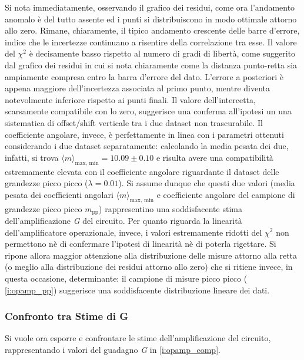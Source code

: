 \documentclass[a4paper,11pt]{article} %
\begin{document}
\noindent Si nota immediatamente, osservando il grafico dei residui, come ora l'andamento anomalo è del tutto assente ed
i punti si distribuiscono in modo ottimale attorno allo zero. Rimane, chiaramente, il tipico andamento crescente delle
barre d'errore, indice che le incertezze continuano a risentire della correlazione tra esse. Il valore del $\chi^2$ è
decisamente basso rispetto al numero di gradi di libertà, come suggerito dal grafico dei residui in cui si nota
chiaramente come la distanza punto-retta sia ampiamente compresa entro la barra d'errore del dato. L'errore a posteriori
è appena maggiore dell'incertezza associata al primo punto, mentre diventa notevolmente inferiore rispetto ai punti
finali. Il valore dell'intercetta, scarsamente compatibile con lo zero, suggerisce una conferma all'ipotesi un una
sistematica di offset/shift verticale tra i due dataset non trascurabile. Il coefficiente angolare, invece, è
perfettamente in linea con i parametri ottenuti considerando i due dataset separatamente: calcolando la media pesata dei
due, infatti, si trova $\langle m\rangle_{\text{max, min}}=10.09 \pm 0.10$ e risulta avere una compatibilità
estremamente elevata con il coefficiente angolare riguardante il dataset delle grandezze picco picco ($\lambda = 0.01$).
Si assume dunque che questi due valori (media pesata dei coefficienti angolari $\langle m\rangle_{\text{max, min}}$ e
coefficiente angolare del campione di grandezze picco picco $m_{\text{pp}}$) rappresentino una soddisfacente stima
dell'amplificazione \textit{G} del circuito. Per quanto riguarda la linearità dell'amplificatore operazionale, invece, i
valori estremamente ridotti del $\chi^2$ non permettono nè di confermare l'ipotesi di linearità nè di poterla rigettare.
Si ripone allora maggior attenzione alla distribuzione delle misure attorno alla retta (o meglio alla distribuzione dei
residui attorno allo zero) che si ritiene invece, in questa occasione, determinante: il campione di misure picco picco
( \autoref{i:opamp_pp}) suggerisce una soddisfacente distribuzione lineare dei dati. 

\subsubsection{Confronto tra Stime di G}
Si vuole ora esporre e confrontare le stime dell'amplificazione del circuito, rappresentando i valori del guadagno
\textit{G} in \autoref{i:opamp_comp}.
\end{document}
